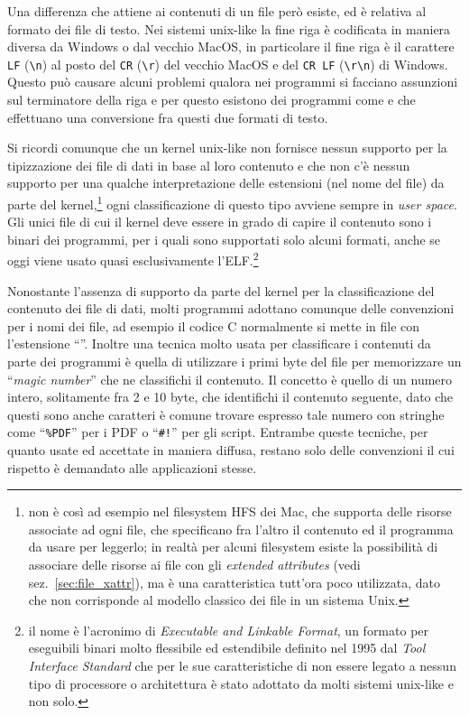 
Una differenza che attiene ai contenuti di un file però esiste, ed è relativa
al formato dei file di testo. Nei sistemi unix-like la fine riga è codificata
in maniera diversa da Windows o dal vecchio MacOS, in particolare il fine riga
è il carattere \texttt{LF} (\verb|\n|) al posto del \texttt{CR} (\verb|\r|)
del vecchio MacOS e del \texttt{CR LF} (\verb|\r\n|) di Windows. Questo può
causare alcuni problemi qualora nei programmi si facciano assunzioni sul
terminatore della riga e per questo esistono dei programmi come 
e  che effettuano una conversione fra questi due formati di
testo.

Si ricordi comunque che un kernel unix-like non fornisce nessun supporto per
la tipizzazione dei file di dati in base al loro contenuto e che non c'è
nessun supporto per una qualche interpretazione delle estensioni (nel nome del
file) da parte del kernel,\footnote{non è così ad esempio nel filesystem HFS
  dei Mac, che supporta delle risorse associate ad ogni file, che specificano
  fra l'altro il contenuto ed il programma da usare per leggerlo; in realtà
  per alcuni filesystem esiste la possibilità di associare delle risorse ai
  file con gli \textit{extended attributes} (vedi sez.~\ref{sec:file_xattr}),
  ma è una caratteristica tutt'ora poco utilizzata, dato che non corrisponde
  al modello classico dei file in un sistema Unix.} ogni classificazione di
questo tipo avviene sempre in \textit{user space}. Gli unici file di cui il
kernel deve essere in grado di capire il contenuto sono i binari dei
programmi, per i quali sono supportati solo alcuni formati, anche se oggi
viene usato quasi esclusivamente
 l'ELF.\footnote{il nome è
  l'acronimo di \textit{Executable and Linkable Format}, un formato per
  eseguibili binari molto flessibile ed estendibile definito nel 1995 dal
  \textit{Tool Interface Standard} che per le sue caratteristiche di non
  essere legato a nessun tipo di processore o architettura è stato adottato da
  molti sistemi unix-like e non solo.}


Nonostante l'assenza di supporto da parte del kernel per la classificazione
del contenuto dei file di dati, molti programmi adottano comunque delle
convenzioni per i nomi dei file, ad esempio il codice C normalmente si mette
in file con l'estensione ``''. Inoltre una tecnica molto usata per
classificare i contenuti da parte dei programmi è quella di utilizzare i primi
byte del file per memorizzare un ``\textit{magic number}'' che ne classifichi
il contenuto. Il concetto è quello di un numero intero, solitamente fra 2 e 10
byte, che identifichi il contenuto seguente, dato che questi sono anche
caratteri è comune trovare espresso tale numero con stringhe come
``\texttt{\%PDF}'' per i PDF o ``\texttt{\#!}'' per gli script. Entrambe
queste tecniche, per quanto usate ed accettate in maniera diffusa, restano
solo delle convenzioni il cui rispetto è demandato alle applicazioni stesse.

